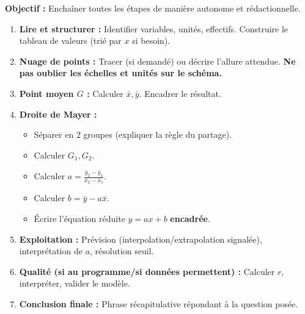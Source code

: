 \documentclass[11pt]{article}
\begin{document}
\begin{methode}
\textbf{Objectif :} Enchaîner toutes les étapes de manière autonome et rédactionnelle.
\begin{enumerate}
    \item \textbf{Lire et structurer :} Identifier variables, unités, effectifs. Construire le tableau de valeurs (trié par $x$ si besoin).
    \item \textbf{Nuage de points :} Tracer (si demandé) ou décrire l'allure attendue. \textbf{Ne pas oublier les échelles et unités sur le schéma.}
    \item \textbf{Point moyen $G$ :} Calculer $\bar{x}, \bar{y}$. Encadrer le résultat.
    \item \textbf{Droite de Mayer :}
    \begin{itemize}
        \item Séparer en 2 groupes (expliquer la règle du partage).
        \item Calculer $G_1, G_2$.
        \item Calculer $a = \frac{\bar{y}_2 - \bar{y}_1}{\bar{x}_2 - \bar{x}_1}$.
        \item Calculer $b = \bar{y} - a\bar{x}$.
        \item Écrire l'équation réduite $y = ax + b$ \textbf{encadrée}.
    \end{itemize}
    \item \textbf{Exploitation :} Prévision (interpolation/extrapolation signalée), interprétation de $a$, résolution seuil.
    \item \textbf{Qualité (si au programme/si données permettent) :} Calculer $r$, interpréter, valider le modèle.
    \item \textbf{Conclusion finale :} Phrase récapitulative répondant à la question posée.
\end{enumerate}
\end{methode}
\end{document}
